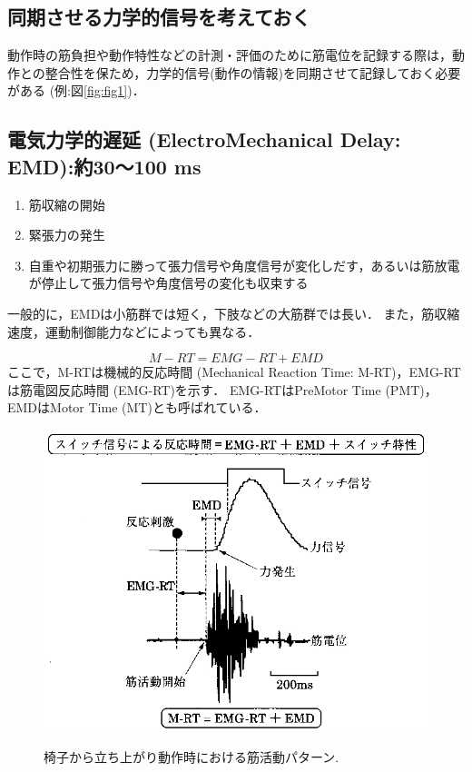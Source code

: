 \documentclass[10pt,twocolumn]{jarticle}
\begin{document}
\subsection{同期させる力学的信号を考えておく}

動作時の筋負担や動作特性などの計測・評価のために筋電位を記録する際は，動作との整合性を保ため，力学的信号(動作の情報)を同期させて記録しておく必要がある (例:図\ref{fig:fig1})．

\subsection{電気力学的遅延 (ElectroMechanical Delay: EMD):約30〜100 ms}

\begin{enumerate}
\item 筋収縮の開始
\item 緊張力の発生
\item 自重や初期張力に勝って張力信号や角度信号が変化しだす，あるいは筋放電が停止して張力信号や角度信号の変化も収束する
\end{enumerate}

一般的に，EMDは小筋群では短く，下肢などの大筋群では長い．
また，筋収縮速度，運動制御能力などによっても異なる．

\begin{equation}
M-RT = EMG-RT + EMD
\end{equation}
ここで，M-RTは機械的反応時間 (Mechanical Reaction Time: M-RT)，EMG-RTは筋電図反応時間 (EMG-RT)を示す．
EMG-RTはPreMotor Time (PMT)，EMDはMotor Time (MT)とも呼ばれている．

\begin{figure}
\begin{center}
{
   \scalebox{0.8}
   {
      \includegraphics{emg004.eps}
   }
}
\caption{椅子から立ち上がり動作時における筋活動パターン.}
\label{fig:fig4}
\end{center}
\end{figure}
\end{document}
